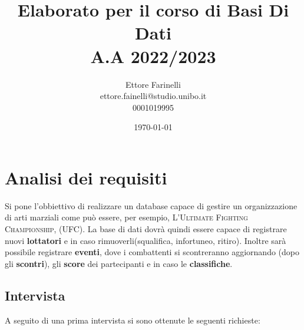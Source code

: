 \documentclass[a4paper,12pt]{report}
\title{\textbf{Elaborato per il corso di Basi Di Dati \\ A.A 2022/2023}}
\author{Ettore Farinelli \\ ettore.fainelli@studio.unibo.it \\ 0001019995}
\date{\today}
\begin{document}
\maketitle

\tableofcontents

\chapter{Analisi dei requisiti}
Si pone l'obbiettivo di realizzare un database capace di gestire un organizzazione di arti marziali come può essere, 
per esempio, \textsc{L'Ultimate Fighting Championship, (UFC)}. La base di dati dovrà quindi essere capace di registrare 
nuovi \textbf{lottatori} e in caso rimuoverli(squalifica, infortuneo, ritiro). Inoltre sarà possibile registrare \textbf{eventi}, 
dove i combattenti si scontreranno aggiornando (dopo gli \textbf{scontri}), gli \textbf{score} dei partecipanti 
e in caso le \textbf{classifiche}.

\section{Intervista}
A seguito di una prima intervista si sono ottenute le seguenti richieste:\medskip
\end{document}
